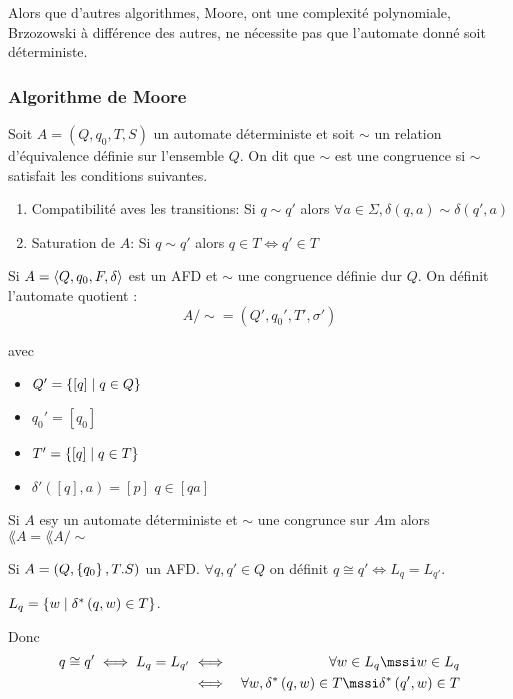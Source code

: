 \begin{remarque}
	Alors que d'autres algorithmes, \tq Moore, ont une complexité polynomiale, Brzozowski à différence des autres, ne nécessite pas
	que l'automate donné soit déterministe.
\end{remarque}

\subsubsection{Algorithme de Moore}


\begin{definition}

	Soit $A = (Q,q_0,T,S)$ un automate déterministe et soit $\sim$ un relation d'équivalence définie sur l'ensemble $Q$. On dit que
	$\sim$ est une congruence si $\sim$ satisfait les conditions suivantes.
	\begin{enumerate}
		\item Compatibilité aves les transitions: Si $q \sim q'$ alors $\forall a \in \Sigma, \delta (q,a) \sim \delta (q',a)$
		\item Saturation de $A$: Si $q \sim q'$ alors $q \in T \iff q' \in T$
	\end{enumerate}
\end{definition}


Si $A = \langle Q, q_0, F, \delta \rangle$ est un AFD et $\sim$ une congruence définie dur $Q$. On définit l'automate quotient :
$$ A/\sim = (Q',q_0',T',\sigma') $$

avec \begin{itemize}
	\item $Q' = \left\{[q] \mid q\in Q\right\}$
	\item $q_0' = [q_0]$
	\item $T' =\left\{[q] \mid q \in T\right\}$
	\item $\delta'([q], a) = [p]$ \ssi $q\in [qa]$
\end{itemize}

\begin{prop}
	Si $A$ esy un automate déterministe et $\sim$ une congrunce sur $A$m alors $\lang A = \lang {A/\sim}$
\end{prop}


\begin{definition}

	Si $A = (Q, \left\{q_0\right\}, T . S)$ un AFD. $\forall q, q' \in Q$ on définit $q \cong q' \iff L_q = L_{q'}$.
\end{definition}

\begin{rappel}
	$L_q = \left\{w \mid \delta^{*} \left(q,w\right) \in T\right\}$.

	Donc
	\begin{eqnarray*}
		q \cong q' \iff L_q = L_{q'} &\iff& \forall w \in L_q \mssi w \in L_q \\
		&\iff& \forall w, \deltaS q w \in T \mssi  \deltaS {q'} w \in T
	\end{eqnarray*}
\end{rappel}


